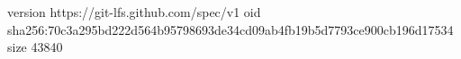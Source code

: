version https://git-lfs.github.com/spec/v1
oid sha256:70c3a295bd222d564b95798693de34cd09ab4fb19b5d7793ce900cb196d17534
size 43840
